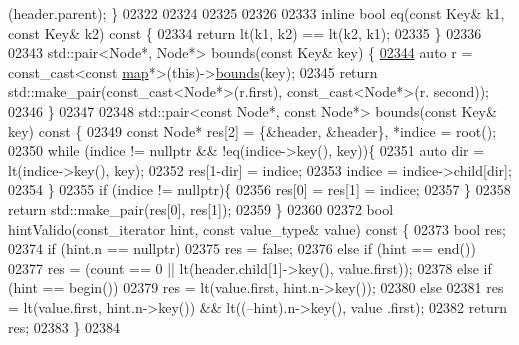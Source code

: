\begin{DoxyCode}
      (header.parent); \}
02322 
02324 
02325 
02326 
02333     \textcolor{keyword}{inline} \textcolor{keywordtype}{bool} eq(\textcolor{keyword}{const} Key& k1, \textcolor{keyword}{const} Key& k2)\textcolor{keyword}{ const }\{
02334         \textcolor{keywordflow}{return} lt(k1, k2) == lt(k2, k1);
02335     \}
02336 
02343     std::pair<Node*, Node*> bounds(\textcolor{keyword}{const} Key& key) \{
\hypertarget{map_8h_source_l02344}{}\hyperlink{classaed2_1_1map_a4d903414b3f1f1e6f785342bb3900572_a4d903414b3f1f1e6f785342bb3900572}{02344}         \textcolor{keyword}{auto} r = \textcolor{keyword}{const\_cast<}\textcolor{keyword}{const }\hyperlink{classaed2_1_1map}{map}*\textcolor{keyword}{>}(\textcolor{keyword}{this})->\hyperlink{classaed2_1_1map_a4d903414b3f1f1e6f785342bb3900572_a4d903414b3f1f1e6f785342bb3900572}{bounds}(key);
02345         \textcolor{keywordflow}{return} std::make\_pair(const\_cast<Node*>(r.first), const\_cast<Node*>(r.
      second));
02346     \}
02347 
02348     std::pair<const Node*, const Node*> bounds(\textcolor{keyword}{const} Key& key)\textcolor{keyword}{ const }\{
02349         \textcolor{keyword}{const} Node* res[2] = \{&header, &header\}, *indice = root();
02350         \textcolor{keywordflow}{while} (indice != \textcolor{keyword}{nullptr} && !eq(indice->key(), key))\{
02351             \textcolor{keyword}{auto} dir = lt(indice->key(), key);
02352             res[1-dir] = indice;
02353             indice = indice->child[dir];
02354         \}
02355         \textcolor{keywordflow}{if} (indice != \textcolor{keyword}{nullptr})\{
02356             res[0] = res[1] = indice;
02357         \}
02358         \textcolor{keywordflow}{return} std::make\_pair(res[0], res[1]);
02359     \}
02360 
02372     \textcolor{keywordtype}{bool} hintValido(const\_iterator hint, \textcolor{keyword}{const} value\_type& value)\textcolor{keyword}{ const }\{
02373         \textcolor{keywordtype}{bool} res;
02374         \textcolor{keywordflow}{if} (hint.n == \textcolor{keyword}{nullptr})
02375             res = \textcolor{keyword}{false};
02376         \textcolor{keywordflow}{else} \textcolor{keywordflow}{if} (hint == end())
02377             res = (count == 0 || lt(header.child[1]->key(), value.first));
02378         \textcolor{keywordflow}{else} \textcolor{keywordflow}{if} (hint == begin())
02379             res = lt(value.first, hint.n->key());
02380         \textcolor{keywordflow}{else}
02381             res = lt(value.first, hint.n->key()) && lt((--hint).n->key(), value
      .first);
02382         \textcolor{keywordflow}{return} res;
02383     \}
02384 

\end{DoxyCode}
